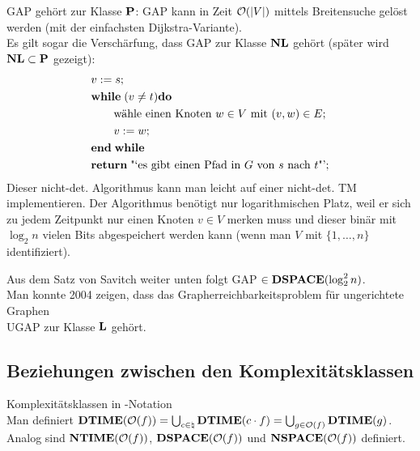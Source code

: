 \begin{Bem}
    GAP gehört zur Klasse $\P$:
    GAP kann in Zeit $\O(|V|)$ mittels Breitensuche gelöst werden
    (mit der einfachsten Dijkstra-Variante).\\
    Es gilt sogar die Verschärfung, dass GAP zur Klasse $\NL$ gehört
    (später wird $\NL \subset \P$ gezeigt):
    \begin{align*}&
        v := s;\\&
        \WHILE (v \not= t) \DO\\&
        \qquad \text{wähle einen Knoten } w \in V \text{ mit } (v, w) \in E;\\&
        \qquad v := w;\\&
        \END\WHILE\\&
        \RETURN \text{"`es gibt einen Pfad in } G \text{ von } s \text{ nach } t \text{"'};
    \end{align*}
    Dieser nicht-det. Algorithmus kann man leicht auf einer nicht-det. TM implementieren.
    Der Algorithmus benötigt nur logarithmischen Platz, weil er sich zu jedem Zeitpunkt
    nur einen Knoten $v \in V$ merken muss und dieser binär mit $\log_2 n$ vielen Bits
    abgespeichert werden kann (wenn man $V$ mit $\{1, \dotsc, n\}$ identifiziert).
\end{Bem}

\begin{Bem}
    Aus dem Satz von Savitch weiter unten folgt GAP $\in \DSPACE(\log_2^2 n)$.\\
    Man konnte 2004 zeigen, dass das Grapherreichbarkeitsproblem für ungerichtete Graphen\\
    UGAP zur Klasse $\L$ gehört.
\end{Bem}

\subsection{%
    Beziehungen zwischen den Komplexitätsklassen%
}

\begin{Def}{Komplexitätsklassen in -Notation}\\
    Man definiert $\DTIME(\O(f)) = \bigcup_{c \in \natural} \DTIME(c \cdot f) =
    \bigcup_{g \in \O(f)} \DTIME(g)$.\\
    Analog sind $\NTIME(\O(f))$, $\DSPACE(\O(f))$ und $\NSPACE(\O(f))$ definiert.
\end{Def}

